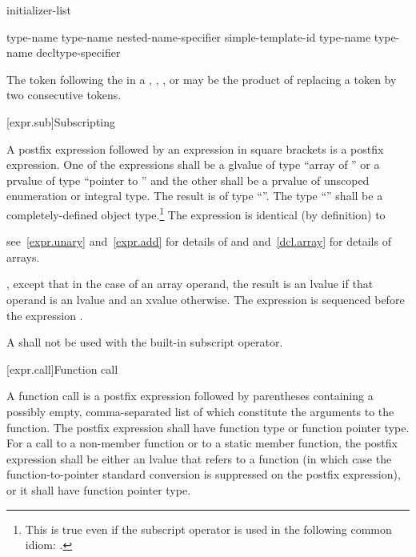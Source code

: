 \begin{bnf}
\br
    initializer-list
\end{bnf}


\begin{bnf}
\br
     type-name \terminal{::\,\~} type-name\br
    nested-name-specifier  simple-template-id \terminal{::\,\~} type-name\br
    \terminal{\~} type-name\br
    \terminal{\~} decltype-specifier
\end{bnf}

\pnum
\begin{note} The \tcode{>} token following the
 in a ,
, , or
 may be the product of replacing a
\tcode{>{>}} token by two consecutive \tcode{>}
tokens.\end{note}

[expr.sub]{Subscripting}

\pnum
{}%
%
A postfix expression followed by an expression in square brackets is a
postfix expression. One of the expressions shall be a glvalue of type ``array of
'' or a prvalue of type ``pointer
to '' and the other shall be a prvalue of unscoped enumeration or integral type.
The result is of type ``''.
%
The type ``'' shall be a completely-defined object type.\footnote{This
is true even if the subscript operator is used in the following common idiom:
.}
The expression  is identical (by definition) to
\begin{note}
see~\ref{expr.unary} and~\ref{expr.add} for details of \tcode{*} and
\tcode{+} and~\ref{dcl.array} for details of arrays.
\end{note}, except that in the case of an array operand, the result is an lvalue
if that operand is an lvalue and an xvalue otherwise.
The expression  is sequenced before the expression .

\pnum
A  shall not be used with the built-in subscript operator.

[expr.call]{Function call}

\pnum
{}%
%
%
A function call is a postfix expression followed by parentheses
containing a possibly empty, comma-separated list of
 which
constitute the arguments to the function. The postfix expression shall
have function type or function pointer type.
For a call to a non-member function or to a static member function,
the postfix expression shall be either an lvalue that refers to a
function (in which case the function-to-pointer standard
conversion is suppressed on the postfix expression),
or it shall have function pointer type.

